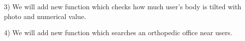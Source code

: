 \documentclass[conference]{IEEEtran}
\begin{document}
3) We will add new function which checks how much user's body is tilted with photo and numerical value.

4) We will add new function which searches an orthopedic office near users. 













%
%
%




\end{document}
